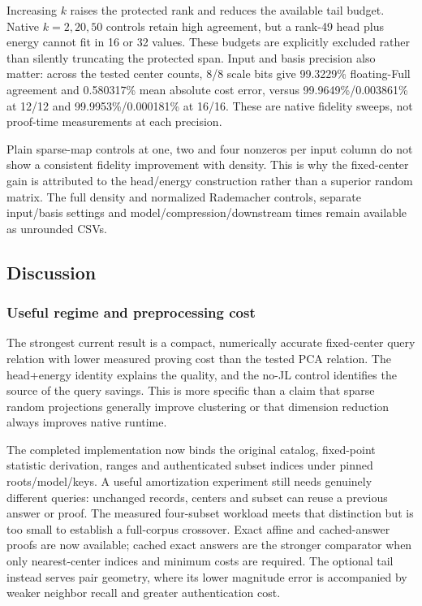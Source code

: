 Increasing $k$ raises the protected rank and reduces the available tail budget. Native $k=2,20,50$ controls retain high agreement, but a rank-49 head plus energy cannot fit in 16 or 32 values. These budgets are explicitly excluded rather than silently truncating the protected span. Input and basis precision also matter: across the tested center counts, 8/8 scale bits give 99.3229\% floating-Full agreement and 0.580317\% mean absolute cost error, versus 99.9649\%/0.003861\% at 12/12 and 99.9953\%/0.000181\% at 16/16. These are native fidelity sweeps, not proof-time measurements at each precision.



Plain sparse-map controls at one, two and four nonzeros per input column do not show a consistent fidelity improvement with density. This is why the fixed-center gain is attributed to the head/energy construction rather than a superior random matrix. The full density and normalized Rademacher controls, separate input/basis settings and model/compression/downstream times remain available as unrounded CSVs.

\subsection{Discussion}\label{sec:discussion}
\subsubsection{Useful regime and preprocessing cost}
The strongest current result is a compact, numerically accurate fixed-center query relation with lower measured proving cost than the tested PCA relation. The head+energy identity explains the quality, and the no-JL control identifies the source of the query savings. This is more specific than a claim that sparse random projections generally improve clustering or that dimension reduction always improves native runtime.

The completed implementation now binds the original catalog, fixed-point statistic derivation, ranges and authenticated subset indices under pinned roots/model/keys. A useful amortization experiment still needs genuinely different queries: unchanged records, centers and subset can reuse a previous answer or proof. The measured four-subset workload meets that distinction but is too small to establish a full-corpus crossover. Exact affine and cached-answer proofs are now available; cached exact answers are the stronger comparator when only nearest-center indices and minimum costs are required. The optional tail instead serves pair geometry, where its lower magnitude error is accompanied by weaker neighbor recall and greater authentication cost.

